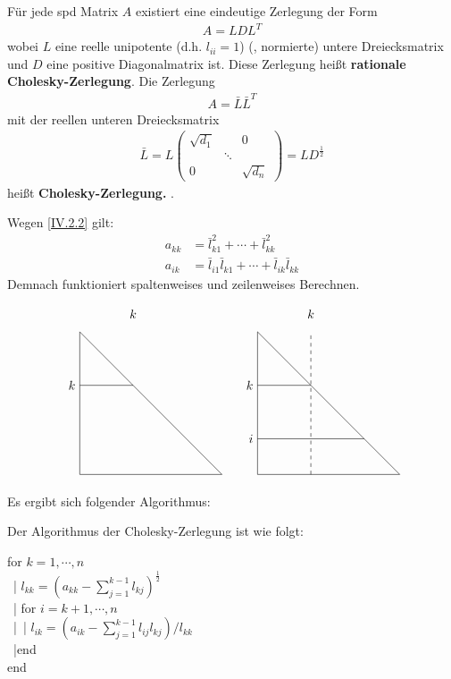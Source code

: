 \begin{Fole}
	\label{4.2.2}
	Für jede spd Matrix $A$ existiert eine eindeutige Zerlegung der Form 
	\begin{gather*}
	A= LDL^T
	\end{gather*}
	wobei $L$ eine reelle unipotente (d.h. $l_{ii}=1$)  (, normierte)  untere 
	Dreiecksmatrix  und $D$ eine positive Diagonalmatrix ist. 
	Diese Zerlegung heißt \textbf{rationale Cholesky-Zerlegung}. Die Zerlegung
	\begin{gather}
	A= \bar{L}\bar{L}^T 
	\label{IV.2.2}
	\end{gather}
	mit der reellen unteren Dreiecksmatrix
	\begin{gather*}
	\bar{L} = L \begin{pmatrix}
	\sqrt{d_1} &&0 \\
	& \ddots & \\
	0&& \sqrt{d_n}
	\end{pmatrix} = LD^{\frac{1}{2}}
	\end{gather*}
	heißt \textbf{Cholesky-Zerlegung.} .
	
	Wegen \eqref{IV.2.2} gilt: 
	\begin{align}
	a_{kk} &= \bar{l}_{k1}^{2} + \cdots +  \bar{l}_{kk}^2  \label{IV.2.3} \\
	a_{ik} &= \bar{l}_{i1} \bar{l}_{k1} + \cdots + \bar{l}_{ik} \bar{l}_{kk}  \label{IV.2.4}
	\end{align}
	Demnach funktioniert spaltenweises und zeilenweises Berechnen. 
		
	\begin{gather*}
		\begin{tikzpicture}
		\foreach \x in {0,5}
		{
			\draw (\x,0) -- (\x+4,0) -- (\x,4) -- cycle;
			\draw (\x,2.5) node[left] {$k$} -- (\x+1.5,2.5);
			\draw (\x+1.5,4.5) node {$k$};
		}
		\draw[dash pattern=on 3pt off 3pt] (6.5,0) -- (6.5,4);
		\draw (5,1) node[left] {$i$} -- (8,1);
		\end{tikzpicture}
	\end{gather*}
\end{Fole}

Es ergibt sich folgender Algorithmus:


Der Algorithmus der Cholesky-Zerlegung ist wie folgt:

\begin{pseudocode}{0.55\linewidth}
	for  $k=1, \cdots , n$\\
	~|\> $l_{kk} = (a_{kk}-\sum_{j=1}^{k-1}l_{kj})^{\frac{1}{2}}$ \\
	~|\> for $i= k+1, \cdots , n$ \\
	~|\>~|\> $l_{ik} = ( a_{ik}- \sum_{j=1}^{k-1}l_{ij} l_{kj})/{l_{kk}}$  \\
	~|\>end\\
	end
\end{pseudocode}




